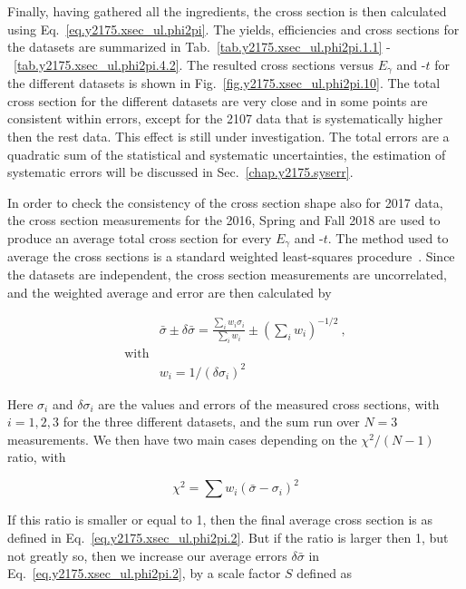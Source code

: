 Finally, having gathered all the ingredients, the cross section is then calculated using Eq.~\ref{eq.y2175.xsec_ul.phi2pi}. The yields, efficiencies and cross sections for the datasets are summarized in Tab.~\ref{tab.y2175.xsec_ul.phi2pi.1.1} -~\ref{tab.y2175.xsec_ul.phi2pi.4.2}. The resulted cross sections versus $E_{\gamma}$ and -$t$ for the different datasets is shown in Fig.~\ref{fig.y2175.xsec_ul.phi2pi.10}. The total cross section for the different datasets are very close and in some points are consistent within errors, except for the 2107 data that is systematically higher then the rest data. This effect is still under investigation. The total errors are a quadratic sum of the statistical and systematic uncertainties, the estimation of systematic errors will be discussed in Sec.~\ref{chap.y2175.syserr}.
~\par In order to check the consistency of the cross section shape also for 2017 data, the cross section measurements for the 2016, Spring and Fall 2018 are used to produce an average total cross section for every $E_{\gamma}$ and -$t$. The method used to average the cross sections is a standard weighted least-squares procedure~\cite{Tanabashi18}. Since the datasets are independent, the cross section measurements are uncorrelated, and the weighted average and error are then calculated by

\begin{equation}
    \label{eq.y2175.xsec_ul.phi2pi.2}
    \begin{aligned}
        & \bar{\sigma} \pm \delta\bar{\sigma} = \frac{\sum_{i}w_{i}\sigma_{i}}{\sum_{i}w_{i}} \pm  \left(\sum_{i}w_{i}\right)^{-1/2}~, \\
        \mathrm{with}\\
        & w_{i} = 1/(\delta \sigma_{i})^2
    \end{aligned}
\end{equation}

\noindent Here $\sigma_{i}$ and $\delta \sigma_{i}$ are the values and errors of the measured cross sections, with $i=1,2,3$ for the three different datasets, and the sum run over $N=3$ measurements. We then have two main cases depending on the $\chi^{2}/(N-1)$ ratio, with 

\begin{equation}
    \label{eq.y2175.xsec_ul.phi2pi.3}
    \chi^{2} = \sum w_{i}(\bar{\sigma}-\sigma_{i})^2
\end{equation}

If this ratio is smaller or equal to 1, then the final average cross section is as defined in Eq.~\ref{eq.y2175.xsec_ul.phi2pi.2}. But if the ratio is larger then 1, but not greatly so, then we increase our average errors $\delta\bar{\sigma}$ in Eq.~\ref{eq.y2175.xsec_ul.phi2pi.2}, by a scale factor $S$ defined as

